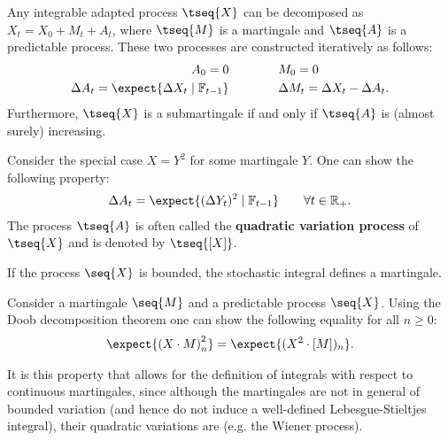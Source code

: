     \begin{theorem}
        Any integrable adapted process $\tseq{X}$ can be decomposed as $X_t=X_0+M_t+A_t$, where $\tseq{M}$ is a martingale and $\tseq{A}$ is a predictable process. These two processes are constructed iteratively as follows:
        \begin{align}
            A_0 = 0\qquad&\qquad M_0 = 0\\
            \Delta A_t = \expect{\Delta X_t\mid\mathbb{F}_{t-1}}\qquad&\qquad\Delta M_t = \Delta X_t - \Delta A_t.
        \end{align}
        Furthermore, $\tseq{X}$ is a submartingale if and only if $\tseq{A}$ is (almost surely) increasing.
    \end{theorem}
    \begin{result}
        Consider the special case $X=Y^2$ for some martingale $Y$. One can show the following property:
        \begin{gather}
            \Delta A_t = \expect{(\Delta Y_t)^2\mid\mathbb{F}_{t-1}}\qquad\forall t\in\mathbb{R}_+.
        \end{gather}
        The process $\tseq{A}$ is often called the \textbf{quadratic variation process} of $\tseq{X}$ and is denoted by $\tseq{[X]}$.
    \end{result}

    \begin{property}
        If the process $\seq{X}$ is bounded, the stochastic integral defines a martingale.
    \end{property}

    \begin{property}[It\^o isometry]
        Consider a martingale $\seq{M}$ and a predictable process $\seq{X}$. Using the Doob decomposition theorem one can show the following equality for all $n\geq0$:
        \begin{gather}
            \expect{\left(X\cdot M\right)_n^2} = \expect{(X^2\cdot[M])_n}.
        \end{gather}
    \end{property}
    It is this property that allows for the definition of integrals with respect to continuous martingales, since although the martingales are not in general of bounded variation (and hence do not induce a well-defined Lebesgue-Stieltjes integral), their quadratic variations are (e.g. the Wiener process).

